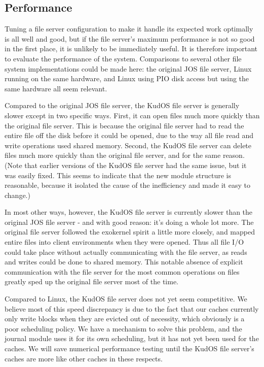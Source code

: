 \subsection{Performance}
\label{sec:eval:performance}

Tuning a file server configuration to make it handle its expected work optimally
is all well and good, but if the file server's maximum performance is not so
good in the first place, it is unlikely to be immediately useful. It is
therefore important to evaluate the performance of the system. Comparisons to
several other file system implementations could be made here: the original JOS
file server, Linux running on the same hardware, and Linux using PIO disk access
but using the same hardware all seem relevant.

Compared to the original JOS file server, the KudOS file server is generally
slower except in two specific ways. First, it can open files much more quickly
than the original file server. This is because the original file server had to
read the entire file off the disk before it could be opened, due to the way all
file read and write operations used shared memory. Second, the KudOS file server
can delete files much more quickly than the original file server, and for the
same reason. (Note that earlier versions of the KudOS file server had the same
issue, but it was easily fixed. This seems to indicate that the new module
structure is reasonable, because it isolated the cause of the inefficiency and
made it easy to change.)

In most other ways, however, the KudOS file server is currently slower than the
original JOS file server - and with good reason: it's doing a whole lot more.
The original file server followed the exokernel spirit a little more closely,
and mapped entire files into client environments when they were opened. Thus all
file I/O could take place without actually communicating with the file server,
as reads and writes could be done to shared memory. This notable absence of
explicit communication with the file server for the most common operations on
files greatly sped up the original file server most of the time.

Compared to Linux, the KudOS file server does not yet seem competitive. We
believe most of this speed discrepancy is due to the fact that our caches
currently only write blocks when they are evicted out of necessity, which
obviously is a poor scheduling policy. We have a mechanism to solve this
problem, and the journal module uses it for its own scheduling, but it has not
yet been used for the caches. We will save numerical performance testing until
the KudOS file server's caches are more like other caches in these respects.
